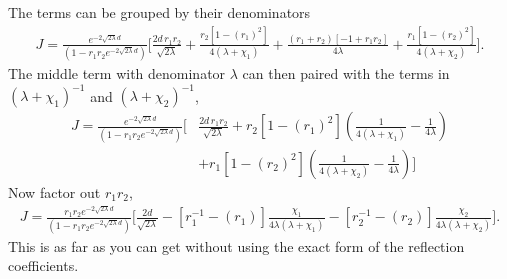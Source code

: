 The terms can be grouped by their denominators 
\begin{align}
  J=\frac{e^{-2\sqrt{2\lambda}d}}{(1-r_1r_2 e^{-2\sqrt{2\lambda}d})}
    \bigg[\frac{2d\,r_1r_2 }{\sqrt{2\lambda}}
  +\frac{r_2 [1 - (r_1)^2]}{4(\lambda+\chi_1)} 
     +\frac{(r_1 +r_2)[-1+r_1r_2]}
    {4\lambda}
    +\frac{r_1[1-(r_2)^2]}{4(\lambda+\chi_2)}\bigg].
  \end{align}
The middle term with denominator $\lambda$ can then paired with the terms in $(\lambda+\chi_1)^{-1}$
and $(\lambda+\chi_2)^{-1}$,
\begin{align}
  J=\frac{e^{-2\sqrt{2\lambda}d}}{(1-r_1r_2 e^{-2\sqrt{2\lambda}d})}
    \bigg[&\frac{2d\,r_1r_2 }{\sqrt{2\lambda}}
    +r_2 [1 - (r_1)^2]\left(\frac{1}{4(\lambda+\chi_1)}-\frac{1}{4\lambda} \right)\nonumber\\
    &+r_1[1-(r_2)^2]\left(\frac{1}{4(\lambda+\chi_2)}-\frac{1}{4\lambda}\right)\bigg]
  \end{align}
Now factor out $r_1r_2$,  
\begin{align*}
  J=\frac{r_1r_2e^{-2\sqrt{2\lambda}d}}{(1-r_1r_2 e^{-2\sqrt{2\lambda}d})}
    \bigg[\frac{2d}{\sqrt{2\lambda}}
    -[r_1^{-1} - (r_1)]\frac{\chi_1}{4\lambda(\lambda+\chi_1)}
    -[r_2^{-1}-(r_2)]\frac{\chi_2}{4\lambda(\lambda+\chi_2)}\bigg].
  \end{align*}
This is as far as you can get without using the exact form of the reflection coefficients.  
